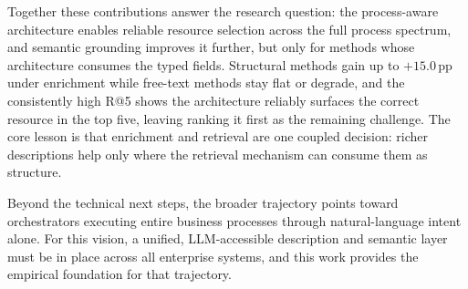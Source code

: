 \documentclass[10pt,twocolumn]{article}
\begin{document}
Together these contributions answer the research question: the process-aware architecture enables reliable resource selection across the full process spectrum, and semantic grounding improves it further, but only for methods whose architecture consumes the typed fields. Structural methods gain up to $+15.0$\,pp under enrichment while free-text methods stay flat or degrade, and the consistently high R@5 shows the architecture reliably surfaces the correct resource in the top five, leaving ranking it first as the remaining challenge. The core lesson is that enrichment and retrieval are one coupled decision: richer descriptions help only where the retrieval mechanism can consume them as structure.

Beyond the technical next steps, the broader trajectory points toward orchestrators executing entire business processes through natural-language intent alone. For this vision, a unified, LLM-accessible description and semantic layer must be in place across all enterprise systems, and this work provides the empirical foundation for that trajectory.




\appendix
\onecolumn

\end{document}
